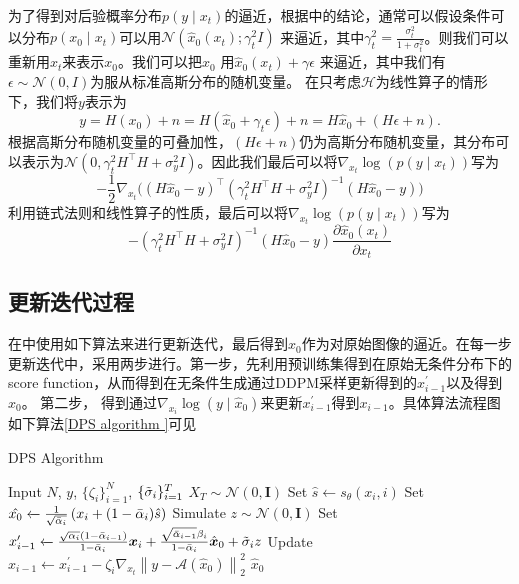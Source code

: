 为了得到对后验概率分布$p(y\mid x_t)$的逼近，根据\cite{pseudoinverse,ddrm}中的结论，通常可以假设条件可以分布$p(x_0\mid x_t)$可以用$\mathcal{N}(\hat{x}_0(x_t);\gamma_t^2 I)$
来逼近，其中$\gamma_t^2 = \frac{\sigma_t^2}{1+\sigma_t^2}$。则我们可以重新用$x_t$来表示$x_0$。我们可以把$x_0$ 用$\hat{x}_0(x_t) + \gamma \epsilon$ 来逼近，其中我们有$\epsilon\sim \mathcal{N}(0,I)$为服从标准高斯分布的随机变量。 在只考虑$\mathcal{H}$为线性算子的情形下，我们将$y$表示为
\begin{equation}
    y=H(x_0)+n = H(\hat{x}_0+\gamma_t \epsilon)+n = H\hat{x}_0 + (H\epsilon+n).
\end{equation}
根据高斯分布随机变量的可叠加性，$(H\epsilon+n)$仍为高斯分布随机变量，其分布可以表示为$\mathcal{N}(0,\gamma_t^2 H^{\top}H + \sigma_y^2 I)$。因此我们最后可以将$\nabla_{x_t}\log(p(y\mid x_t))$写为
\begin{equation}
  -\frac{1}{2} \nabla_{x_t} \bigg((H\hat{x}_0-y)^{\top}\left(\gamma_t^2 H^{\top}H + \sigma_y^2 I\right)^{-1}(H\hat{x}_0-y)\bigg)
\end{equation}
利用链式法则和线性算子的性质，最后可以将$\nabla_{x_t}\log(p(y\mid x_t))$写为
\begin{equation}
    -\left(\gamma_t^2 H^{\top}H + \sigma_y^2 I\right)^{-1}(H\hat{x}_0-y)\frac{\partial \hat{x}_0(x_t)}{\partial x_t}
\end{equation}

\subsection{更新迭代过程}
在\cite{Inverse}中使用如下算法来进行更新迭代，最后得到$\hat{x}_0$作为对原始图像的逼近。在每一步更新迭代中，采用两步进行。第一步，先利用预训练集得到在原始无条件分布下的score function，从而得到在无条件生成通过DDPM采样更新得到的$x_{i-1}^{\prime}$以及得到$\hat{x}_0$。 第二步， 得到通过$\nabla_{x_i}\log(y\mid \hat{x}_0)$来更新$x_{i-1}^{\prime}$得到$x_{i-1}$。具体算法流程图如下算法\ref{DPS algorithm }可见
\begin{breakablealgorithm}
\caption{DPS Algorithm }
\label{DPS algorithm }
    \begin{algorithmic}[1]
   \REQUIRE Input $N$, $y$, $\{\zeta_i\}_{i=1}^{N}$, $\{\Tilde{\sigma}_i\}_{i=1}^{T}$
   \STATE $X_{T}\sim \mathcal{N}(0,\boldsymbol{I})$
   \STATE Set $\hat{s}\xleftarrow{} s_{\theta}(x_i,i)$
   \STATE Set $\hat{x_0} \xleftarrow{} \frac{1}{\sqrt{\Bar{\alpha}_i}}\left(x_i+(1-\Bar{\alpha}_i)\hat{s}\right)$
   \STATE Simulate $z\sim \mathcal{N}(0,\boldsymbol{I})$
   \STATE Set $x^{\prime}_{i-1}\xleftarrow{} \frac{\sqrt{\alpha_i}\left(1-\bar{\alpha}_{i-1}\right)}{1-\bar{\alpha}_i} \boldsymbol{x}_i+\frac{\sqrt{\bar{\alpha}_{i-1}} \beta_i}{1-\bar{\alpha}_i} \hat{\boldsymbol{x}}_0+\Tilde{\sigma}_i {z} $
   \STATE Update $x_{i-1}\xleftarrow{} {x}_{i-1}^{\prime}-\zeta_i \nabla_{{x}_t}\left\|{y}-\mathcal{A}\left(\hat{{x}}_0\right)\right\|_2^2 $
   \ENDFOR
   \RETURN $\hat{x}_0$ 
    \end{algorithmic}
\end{breakablealgorithm}      

